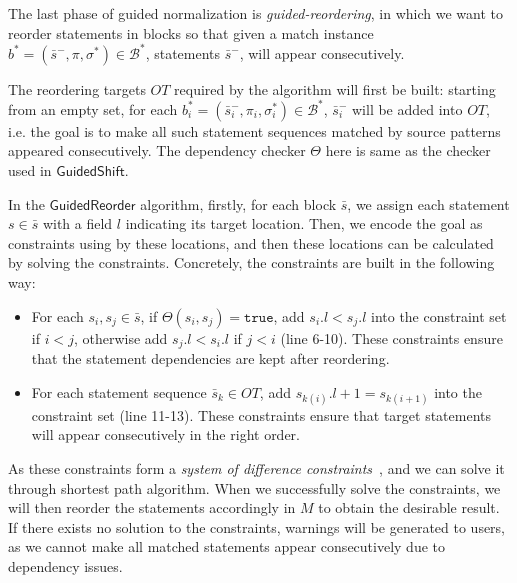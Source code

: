 \documentclass[letterpaper, USenglish]{lipics-v2016}
\theoremstyle{plain}
\begin{document}
The last phase of guided normalization is \emph{guided-reordering}, in which we want to reorder statements in blocks so that given a match instance $b^*=(\bar{s}^-,\pi,\sigma^*)\in \mathcal{B}^*$, statements $\bar{s}^-$, will appear consecutively. 

The reordering targets $\mathit{OT}$ required by the algorithm will first be built: starting from an empty set, for each $b_i^*=(\bar{s}_i^-, \pi_i,\sigma^*_i)\in \mathcal{B}^*$, $\bar{s}_i^-$ will be added into $\mathit{OT}$, i.e. the goal is to make all such statement sequences matched by source patterns appeared consecutively. The dependency checker $\Theta$ here is same as the checker used in $\mathsf{GuidedShift}$.

In the $\mathsf{GuidedReorder}$ algorithm, firstly, for each block $\bar{s}$, we assign each statement $s\in\bar{s}$ with a field $l$ indicating its target location. Then, we encode the goal as constraints using by these locations, and then these locations can be calculated by solving the constraints. Concretely, the constraints are built in the following way:
\begin{itemize}
\item For each $s_i,s_j\in\bar{s}$, if $\Theta(s_i, s_j)=\mathtt{true}$, add $s_i.l < s_j.l$ into the constraint set if $i<j$, otherwise add $s_j.l < s_i.l$ if $j < i$ (line 6-10). These constraints ensure that the statement dependencies are kept after reordering. 
\item For each statement sequence $\bar{s}_k\in \mathit{OT}$, add $s_{k(i)}.l + 1= s_{k(i+1)}$ into the constraint set (line 11-13). These constraints ensure that target statements will appear consecutively in the right order.
\end{itemize}

As these constraints form a \emph{system of difference constraints}~\cite{Cormen:2001:IA:580470}, and we can solve it through shortest path algorithm. When we successfully solve the constraints, we will then reorder the statements accordingly in $M$ to obtain the desirable result. If there exists no solution to the constraints, warnings will be generated to users, as we cannot make all matched statements appear consecutively due to dependency issues.
\end{document}
